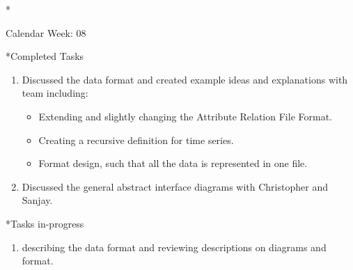 \documentclass[11pt,a4paper]{article}
\begin{document}
\newpage
\begin{section}*{Calendar Week: 08 \hfill \date{26 February, 2021}}
	
	\begin{subsection}*{Completed Tasks}
		\begin{enumerate}
			\item Discussed the data format and created example ideas and explanations with team including:
			\begin{itemize}
				\item Extending and slightly changing the Attribute Relation File Format.
				\item Creating a recursive definition for time series.
				\item Format design, such that all the data is represented in one file.
			\end{itemize}
			\item Discussed the general abstract interface diagrams with Christopher and Sanjay.
		\end{enumerate}
	\end{subsection}
	
	\begin{subsection}*{Tasks in-progress}
		\begin{enumerate}
			\item describing the data format and reviewing descriptions on diagrams and format.
		\end{enumerate}
	\end{subsection}
	
\end{section}
\end{document}
